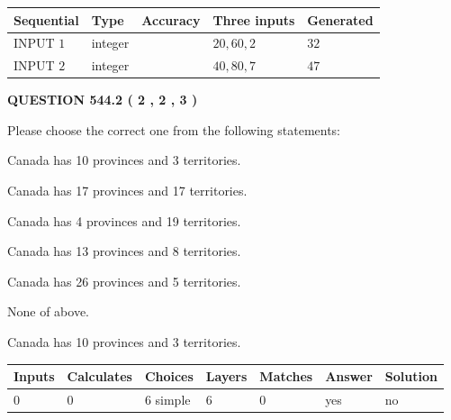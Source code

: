 \documentclass[12pt]{article}
\begin{document}
   
  
  
\noindent\begin{tabular}{|l|l|l|l|l|}
\hline
 Sequential & Type & Accuracy & Three inputs & Generated \\ 
\hline
 
 
  INPUT $  1 $ & integer &  & $
 20
 , 
 60
 , 
 2
 $ & $ 32 $ 
 \\  \hline  
 
 
  INPUT $  2 $ & integer &  & $
 40
 , 
 80
 , 
 7
 $ & $ 47 $ 
 \\  \hline  
 \end{tabular}
   
   
  
\vspace{0.2in}
  
{\textbf{\Large{QUESTION
544.2 
 ( 2 , 2 , 3 )
}}}
  
  
Please choose the correct one from the following statements:
 
 
Canada has 10  provinces and 3 territories.
 
 
Canada has  17 provinces and  17 territories.
 
 
Canada has   4 provinces and  19 territories.
 
 
Canada has  13 provinces and  8 territories.
 
 
Canada has  26 provinces and  5 territories.
 
 
 None of above.
 
 
\noindent{}
 
 
Canada has 10  provinces and 3 territories.
 
 
\noindent{}
 
 
   
   
   
   
\noindent\begin{tabular}{|l|l|l|l|l|l|l|}
 \hline
Inputs & Calculates & Choices & Layers & Matches & Answer & Solution \\ \hline
 0  & 
 0  & 
 6
  simple  
  & 
 6  & 
 0  & 
  yes & 
  no 
  \\ \hline
 \end{tabular}
   
\end{document}
